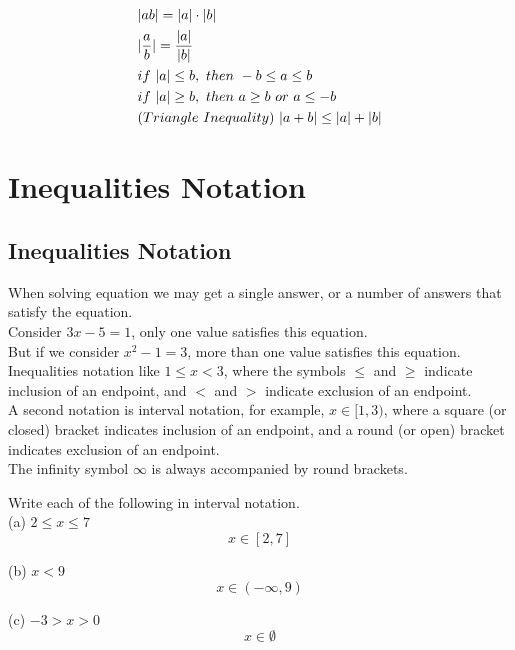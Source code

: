 \begin{theorem}
	\begin{align}
		 & |ab| = |a| \cdot |b|                           \\
		 & |{a \over b}| = {|a| \over |b|}                \\
		 & if\ |a| \le b,\ then\ -b \le a \le b           \\
		 & if\ |a| \ge b,\ then\ a \ge b \ or \ a \le -b  \\
		 & (Triangle \ Inequality)\ |a + b| \le |a| + |b|
	\end{align}
\end{theorem}

\chapter{Inequalities Notation}

\section{Inequalities Notation}

When solving equation we may get a single answer, or a number of answers that satisfy the equation. \\

Consider $ 3x - 5 = 1 $, only one value satisfies this equation. \\

But if we consider $ x^2 - 1 = 3 $, more than one value satisfies this equation. \\

Inequalities notation like $ 1 \le x < 3 $, where the symbols $ \le $ and $ \ge $ indicate inclusion of an endpoint, and $ < $ and $ > $ indicate exclusion of an endpoint. \\

A second notation is interval notation, for example, $ x \in [1, 3) $, where a square (or closed) bracket indicates inclusion of an endpoint, and a round (or open) bracket indicates exclusion of an endpoint. \\

The infinity symbol $ \infty $ is always accompanied by round brackets. \\

\begin{exercise}\nonumber
	Write each of the following in interval notation. \\

	(a) $ 2 \le x \le 7 $ \\
	$$
		x \in [2, 7]
	$$

	(b) $ x < 9 $ \\
	$$
		x \in (-\infty, 9)
	$$

	(c) $ -3 > x > 0 $ \\
	$$
		x \in \emptyset
	$$
\end{exercise}

